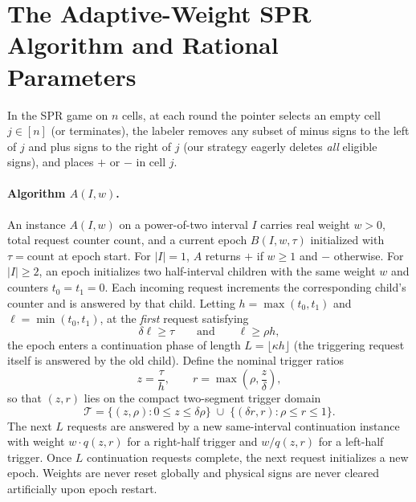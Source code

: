 \documentclass[11pt,letterpaper]{article}
\theoremstyle{definition}
\theoremstyle{remark}
\begin{document}
\section{The Adaptive-Weight SPR Algorithm and Rational Parameters}
In the SPR game on $n$ cells, at each round the pointer selects an empty cell $j \in [n]$ (or terminates), the labeler removes any subset of minus signs to the left of $j$ and plus signs to the right of $j$ (our strategy eagerly deletes \emph{all} eligible signs), and places $+$ or $-$ in cell $j$.

\paragraph{Algorithm $A(I,w)$.}
An instance $A(I,w)$ on a power-of-two interval $I$ carries real weight $w>0$, total request counter $\mathrm{count}$, and a current epoch $B(I,w,\tau)$ initialized with $\tau = \mathrm{count}$ at epoch start. For $|I|=1$, $A$ returns $+$ if $w \ge 1$ and $-$ otherwise. For $|I| \ge 2$, an epoch initializes two half-interval children with the same weight $w$ and counters $t_0=t_1=0$. Each incoming request increments the corresponding child's counter and is answered by that child. Letting $h=\max(t_0,t_1)$ and $\ell=\min(t_0,t_1)$, at the \emph{first} request satisfying
\begin{equation}\label{eq:trigger}
  \delta \ell \ge \tau \qquad \text{and} \qquad \ell \ge \rho h,
\end{equation}
the epoch enters a continuation phase of length $L = \lfloor \kappa h \rfloor$ (the triggering request itself is answered by the old child). Define the nominal trigger ratios
\begin{equation}\label{eq:ratios}
  z = \frac{\tau}{h}, \qquad r = \max\!\left(\rho, \frac{z}{\delta}\right),
\end{equation}
so that $(z,r)$ lies on the compact two-segment trigger domain
\begin{equation}\label{eq:domain}
  \mathcal{T} = \{(z,\rho) : 0 \le z \le \delta\rho\} \;\cup\; \{(\delta r, r) : \rho \le r \le 1\}.
\end{equation}
The next $L$ requests are answered by a new same-interval continuation instance with weight $w\cdot q(z,r)$ for a right-half trigger and $w / q(z,r)$ for a left-half trigger. Once $L$ continuation requests complete, the next request initializes a new epoch. Weights are never reset globally and physical signs are never cleared artificially upon epoch restart.
\end{document}
